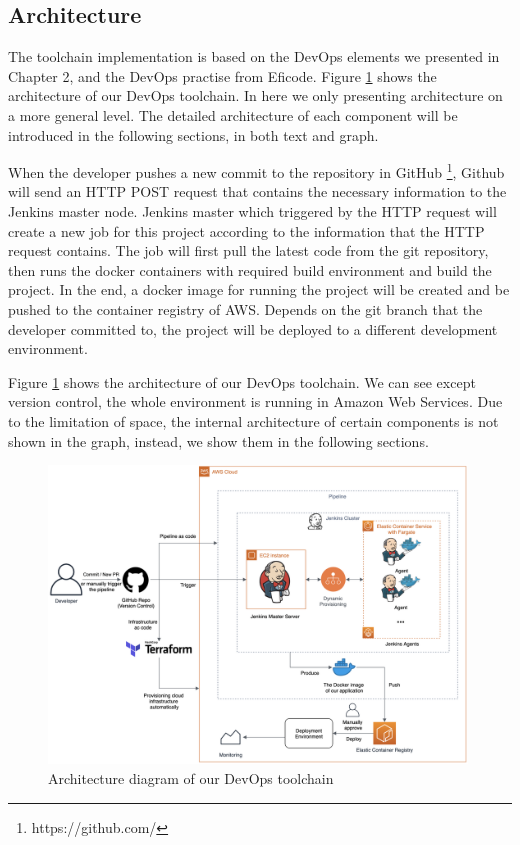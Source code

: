 \subsection{Architecture}
The toolchain implementation is based on the DevOps elements we presented in Chapter 2, and the DevOps practise from Eficode. Figure \ref{fig:archjenkins} shows the architecture of our DevOps toolchain. In here we only presenting architecture on a more general level. The detailed architecture of each component will be introduced in the following sections, in both text and graph.
\par
When the developer pushes a new commit to the repository in GitHub \footnote{https://github.com/}, Github will send an HTTP POST request that contains the necessary information to the Jenkins master node. Jenkins master which triggered by the HTTP request will create a new job for this project according to the information that the HTTP request contains. The job will first pull the latest code from the git repository, then runs the docker containers with required build environment and build the project. In the end, a docker image for running the project will be created and be pushed to the container registry of AWS. Depends on the git branch that the developer committed to, the project will be deployed to a different development environment.
\par
Figure \ref{fig:archjenkins} shows the architecture of our DevOps toolchain. We can see except version control, the whole environment is running in Amazon Web Services. Due to the limitation of space, the internal architecture of certain components is not shown in the graph, instead, we show them in the following sections.
\begin{figure}[h]
    \centering
    \includegraphics[width=0.99\textwidth]{pics/arch-med-jenkins.png}
    \caption{Architecture diagram of our DevOps toolchain}
    \label{fig:archjenkins}
\end{figure}
